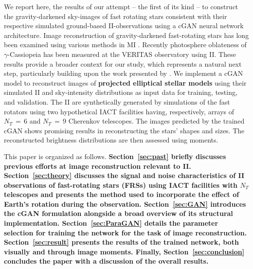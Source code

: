 We report here, the results of our attempt -- the first of its kind -- to construct the gravity-darkened sky-images of fast rotating stars consistent with their respective simulated ground-based II-observations using a cGAN neural network architecture. Image reconstruction of gravity-darkened fast-rotating stars has long been examined using various methods in MI \citep{vanBelle2001, DomicianodeSouza2003, DomicianodeSouza2005, mcalister2005first, Monnier2007, Pedretti2009, Zhao2009, Martinez2021}. Recently photosphere oblateness of $\gamma$-Cassiopeia \citep{Archer-arXiv-2025} has been measured at the VERITAS observatory using II. These results provide a broader context for our study, which represents a natural next step, particularly building upon the work presented by \cite{Archer-arXiv-2025}. We implement a cGAN model \citep{isola2017image} to reconstruct images of {\bf projected elliptical stellar models} using their simulated II and sky-intensity distributions as input data for training, testing, and validation. The II are synthetically generated by simulations of the fast rotators using two hypothetical IACT facilities having, respectively, arrays of $N_T\, =\, 6$ and $N_T\, =\, 9$ Cherenkov telescopes. The images predicted by the trained cGAN shows promising results in reconstructing the stars' shapes and sizes. The reconstructed brightness distributions are then assessed using moments.

This paper is organized as follows. {\bf Section~\ref{sec:past} briefly discusses previous efforts at image reconstruction relevant to II. Section~\ref{sec:theory} discusses the signal and noise characteristics of II observations of fast-rotating stars (FRSs) using IACT {\bf facilities} with \(N_T\) telescopes and presents the method used to incorporate the effect of Earth's rotation during the observation. Section~\ref{sec:GAN} introduces the cGAN formulation alongside a broad	overview of its structural implementation. Section~\ref{sec:ParaGAN} details the parameter selection for training the network for the task of image reconstruction. Section~\ref{sec:result} presents the results of the trained network, both visually and through image moments. Finally, Section~\ref{sec:conclusion} concludes the paper with a discussion of the overall results.}
